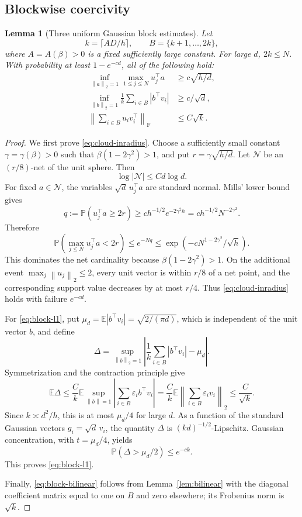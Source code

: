 \documentclass[11pt]{article}
\newtheorem{lemma}[theorem]{Lemma}
\theoremstyle{remark}
\newcommand{\E}{\mathbb E}
\newcommand{\Pp}{\mathbb P}
\newcommand{\norm}[1]{\left\lVert #1\right\rVert}
\newcommand{\F}{\mathrm{F}}
\newcommand{\1}{\mathbf 1}
\begin{document}
\subsection{Blockwise coercivity}

\begin{lemma}[Three uniform Gaussian block estimates]
\label{lem:block-estimates}
Let
\[
 k=\lceil AD/h\rceil,
 \qquad
 B=\{k+1,\ldots,2k\},
\]
where $A=A(\beta)>0$ is a fixed sufficiently large constant.  For large $d$,
$2k\leq N$.  With probability at least $1-e^{-cd}$, all of the
following hold:
\begin{align}
 \inf_{\norm a_2=1}\max_{1\leq j\leq N}u_j^\top a
 &\geq c\sqrt{h/d},
 \label{eq:cloud-inradius}\\
 \inf_{\norm b_2=1}\frac1k\sum_{i\in B}|b^\top v_i|
 &\geq c/\sqrt d,
 \label{eq:block-l1}\\
 \norm{\sum_{i\in B}u_iv_i^\top}_{\F}
 &\leq C\sqrt k.
 \label{eq:block-bilinear}
\end{align}
\end{lemma}

\begin{proof}
We first prove \eqref{eq:cloud-inradius}.  Choose a sufficiently small
constant $\gamma=\gamma(\beta)>0$ such that
$\beta(1-2\gamma^2)>1$, and put
$r=\gamma\sqrt{h/d}$.  Let $\mathcal N$ be an $(r/8)$-net of the unit
sphere.  Then
\[
 \log|\mathcal N|\leq Cd\log d.
\]
For fixed $a\in\mathcal N$, the variables
$\sqrt d\,u_j^\top a$ are standard normal.  Mills' lower bound gives
\[
 q:=\Pp(u_j^\top a\geq2r)
 \geq c h^{-1/2}e^{-2\gamma^2h}
 =c h^{-1/2}N^{-2\gamma^2}.
\]
Therefore
\[
 \Pp\left(\max_{j\leq N}u_j^\top a<2r\right)
 \leq e^{-Nq}
 \leq\exp\!\left(-cN^{1-2\gamma^2}/\sqrt h\right).
\]
This dominates the net cardinality because
$\beta(1-2\gamma^2)>1$.  On the additional event
$\max_j\norm{u_j}_2\leq2$, every unit vector is within $r/8$ of a net
point, and the corresponding support value decreases by at most $r/4$.
Thus \eqref{eq:cloud-inradius} holds with failure $e^{-cd}$.

For \eqref{eq:block-l1}, put
$\mu_d=\E|b^\top v_i|=\sqrt{2/(\pi d)}$, which is independent of the
unit vector $b$, and define
\[
 \Delta=\sup_{\norm b_2=1}
 \left|\frac1k\sum_{i\in B}|b^\top v_i|-\mu_d\right|.
\]
Symmetrization and the contraction principle give
\[
 \E\Delta
 \leq\frac Ck\E\sup_{\norm b=1}
 \left|\sum_{i\in B}\varepsilon_i b^\top v_i\right|
 =\frac Ck\E\norm{\sum_{i\in B}\varepsilon_i v_i}_2
 \leq\frac C{\sqrt k}.
\]
Since $k\asymp d^2/h$, this is at most $\mu_d/4$ for large $d$.  As a
function of the standard Gaussian vectors $g_i=\sqrt d\,v_i$, the
quantity $\Delta$ is $(kd)^{-1/2}$-Lipschitz.  Gaussian concentration,
with $t=\mu_d/4$, yields
\[
 \Pp(\Delta>\mu_d/2)\leq e^{-ck}.
\]
This proves \eqref{eq:block-l1}.

Finally, \eqref{eq:block-bilinear} follows from
Lemma~\ref{lem:bilinear} with the diagonal coefficient matrix equal to
one on $B$ and zero elsewhere; its Frobenius norm is $\sqrt k$.
\end{proof}
\end{document}
